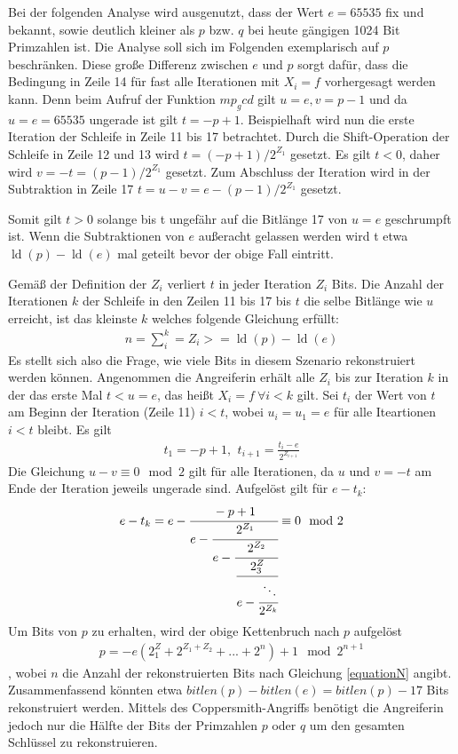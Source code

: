 Bei der folgenden Analyse wird ausgenutzt, dass der Wert $e=65535$ fix und bekannt, sowie deutlich kleiner als $p$ bzw. $q$ bei heute gängigen 1024 Bit Primzahlen ist.
Die Analyse soll sich im Folgenden exemplarisch auf $p$ beschränken.
Diese große Differenz zwischen $e$ und $p$ sorgt dafür, dass die Bedingung in Zeile 14 für fast alle Iterationen mit $X_i = f$ vorhergesagt werden kann.
Denn beim Aufruf der Funktion $mp_gcd$ gilt $u=e, v=p-1$ und da $u=e=65535$ ungerade ist gilt $t=-p+1$.
Beispielhaft wird nun die erste Iteration der Schleife in Zeile 11 bis 17 betrachtet.
Durch die Shift-Operation der Schleife in Zeile 12 und 13 wird $t=(-p+1)/2^{Z_1}$ gesetzt.
Es gilt $t<0$, daher wird $v=-t=(p-1)/2^{Z_1}$ gesetzt. 
Zum Abschluss der Iteration wird in der Subtraktion in Zeile 17 $t=u-v=e-(p-1)/2^{Z_1}$ gesetzt.

Somit gilt $t>0$ solange bis t ungefähr auf die Bitlänge 17 von $u=e$ geschrumpft ist.
Wenn die Subtraktionen von $e$ außeracht gelassen werden wird t etwa $\operatorname{ld}(p) - \operatorname{ld}(e)$ mal geteilt bevor der obige Fall eintritt.

Gemäß der Definition der $Z_i$ verliert $t$ in jeder Iteration $Z_i$ Bits. 
Die Anzahl der Iterationen $k$ der Schleife in den Zeilen 11 bis 17 bis $t$ die selbe Bitlänge wie $u$ erreicht, ist das kleinste $k$ welches folgende Gleichung erfüllt: 
\begin{align}
\label{equationN}
n = \sum\limits_i^k = Z_i >= \operatorname{ld}(p) - \operatorname{ld}(e)
\end{align}
Es stellt sich also die Frage, wie viele Bits in diesem Szenario rekonstruiert werden können.
Angenommen die Angreiferin erhält alle $Z_i$ bis zur Iteration $k$ in der das erste Mal $t<u=e$, das heißt $X_i=f \: \forall i < k$ gilt.
Sei $t_i$ der Wert von $t$ am Beginn der Iteration (Zeile 11) $i<t$, wobei $u_i=u_1=e$ für alle Iteartionen $i<t$ bleibt.
Es gilt 
\begin{align}
t_1=-p+1 \text{, } \: t_{i+1} = \frac{t_i - e}{2^{Z_{i+1}}}
\end{align}
Die Gleichung $u-v \equiv 0 \mod 2$ gilt für alle Iterationen, da $u$ und $v=-t$ am Ende der Iteration jeweils ungerade sind.
Aufgelöst gilt für $e-t_k$:
\begin{align}
e-t_k = e- \cfrac{-p+1}{e - \cfrac{2^{Z_1}}{e- \cfrac{2^{Z_2}}{
          \cfrac{2^Z_3}{e - \cfrac{\ddots}{2^{Z_k}}}}}} \equiv 0 \mod 2
\end{align}
Um Bits von $p$ zu erhalten, wird der obige Kettenbruch nach $p$ aufgelöst
\begin{align}
p = -e(2^Z_1+2^{Z_1+Z_2}+...+2^n)+1 \mod 2^{n+1}
\end{align}
, wobei $n$ die Anzahl der rekonstruierten Bits nach Gleichung \ref{equationN} angibt.
Zusammenfassend könnten etwa $bitlen(p)-bitlen(e)=bitlen(p)-17$ Bits rekonstruiert werden.
Mittels des Coppersmith-Angriffs \cite{CoppersmithBound} benötigt die Angreiferin jedoch nur die Hälfte der Bits der Primzahlen $p$ oder $q$ um den gesamten Schlüssel zu rekonstruieren.

